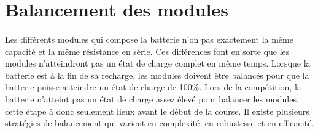 
\section{Balancement des modules}
	\paragraph*{}
	Les différents modules qui compose la batterie n'on pas exactement la même capacité et la même résistance en série. Ces différences font en sorte que les modules n'atteindront pas un état de charge complet en même temps. Lorsque la batterie est à la fin de sa recharge, les modules doivent être balancés pour que la batterie puisse atteindre un état de charge de 100\%. Lors de la compétition, la batterie n'atteint pas un état de charge assez élevé pour balancer les modules, cette étape à donc seulement lieux avant le début de la course. Il existe plusieurs stratégies de balancement qui varient en complexité, en robustesse et en efficacité.